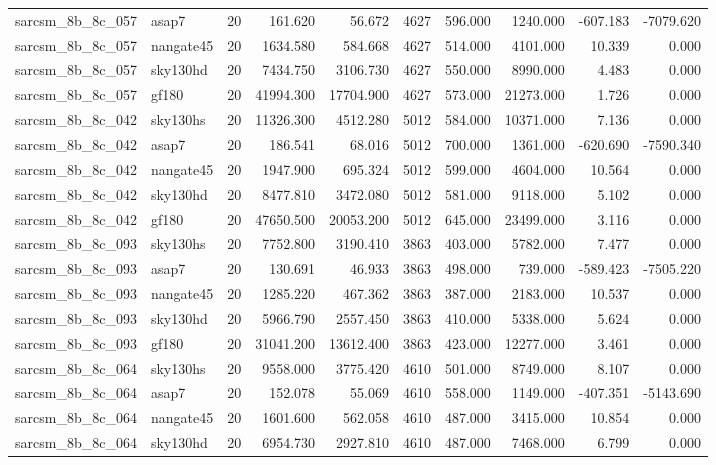 \begin{tabular}{llrrrrrrrr}
sarcsm\_8b\_8c\_057 & asap7 & 20 & 161.620 & 56.672 & 4627 & 596.000 & 1240.000 & -607.183 & -7079.620 \\
sarcsm\_8b\_8c\_057 & nangate45 & 20 & 1634.580 & 584.668 & 4627 & 514.000 & 4101.000 & 10.339 & 0.000 \\
sarcsm\_8b\_8c\_057 & sky130hd & 20 & 7434.750 & 3106.730 & 4627 & 550.000 & 8990.000 & 4.483 & 0.000 \\
sarcsm\_8b\_8c\_057 & gf180 & 20 & 41994.300 & 17704.900 & 4627 & 573.000 & 21273.000 & 1.726 & 0.000 \\
sarcsm\_8b\_8c\_042 & sky130hs & 20 & 11326.300 & 4512.280 & 5012 & 584.000 & 10371.000 & 7.136 & 0.000 \\
sarcsm\_8b\_8c\_042 & asap7 & 20 & 186.541 & 68.016 & 5012 & 700.000 & 1361.000 & -620.690 & -7590.340 \\
sarcsm\_8b\_8c\_042 & nangate45 & 20 & 1947.900 & 695.324 & 5012 & 599.000 & 4604.000 & 10.564 & 0.000 \\
sarcsm\_8b\_8c\_042 & sky130hd & 20 & 8477.810 & 3472.080 & 5012 & 581.000 & 9118.000 & 5.102 & 0.000 \\
sarcsm\_8b\_8c\_042 & gf180 & 20 & 47650.500 & 20053.200 & 5012 & 645.000 & 23499.000 & 3.116 & 0.000 \\
sarcsm\_8b\_8c\_093 & sky130hs & 20 & 7752.800 & 3190.410 & 3863 & 403.000 & 5782.000 & 7.477 & 0.000 \\
sarcsm\_8b\_8c\_093 & asap7 & 20 & 130.691 & 46.933 & 3863 & 498.000 & 739.000 & -589.423 & -7505.220 \\
sarcsm\_8b\_8c\_093 & nangate45 & 20 & 1285.220 & 467.362 & 3863 & 387.000 & 2183.000 & 10.537 & 0.000 \\
sarcsm\_8b\_8c\_093 & sky130hd & 20 & 5966.790 & 2557.450 & 3863 & 410.000 & 5338.000 & 5.624 & 0.000 \\
sarcsm\_8b\_8c\_093 & gf180 & 20 & 31041.200 & 13612.400 & 3863 & 423.000 & 12277.000 & 3.461 & 0.000 \\
sarcsm\_8b\_8c\_064 & sky130hs & 20 & 9558.000 & 3775.420 & 4610 & 501.000 & 8749.000 & 8.107 & 0.000 \\
sarcsm\_8b\_8c\_064 & asap7 & 20 & 152.078 & 55.069 & 4610 & 558.000 & 1149.000 & -407.351 & -5143.690 \\
sarcsm\_8b\_8c\_064 & nangate45 & 20 & 1601.600 & 562.058 & 4610 & 487.000 & 3415.000 & 10.854 & 0.000 \\
sarcsm\_8b\_8c\_064 & sky130hd & 20 & 6954.730 & 2927.810 & 4610 & 487.000 & 7468.000 & 6.799 & 0.000 \\

\end{tabular}
